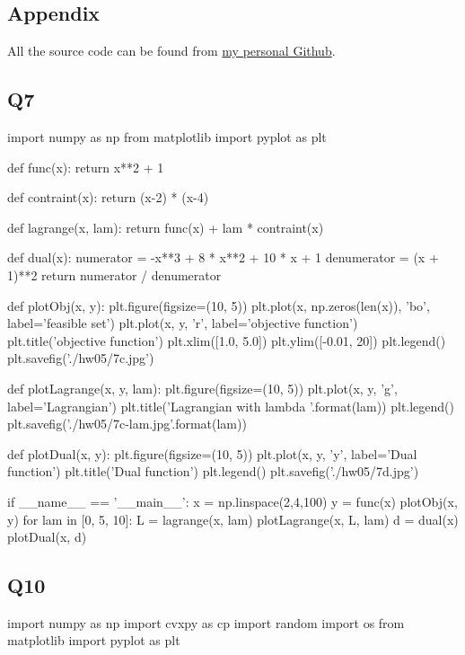 \documentclass[12pt, a4 paper]{article}
\begin{document}
    \begin{framed}
        \section{Appendix}
        All the source code can be found from
        \href{https://github.com/masqueraderx}{my personal Github}.
        \subsection{Q7}
        \begin{python}
import numpy as np
from matplotlib import pyplot as plt

def func(x):
    return x**2 + 1

def contraint(x):
    return (x-2) * (x-4)

def lagrange(x, lam):
    return func(x) + lam * contraint(x)

def dual(x):
    numerator = -x**3 + 8 * x**2 + 10 * x + 1
    denumerator = (x + 1)**2
    return numerator / denumerator

def plotObj(x, y):
    plt.figure(figsize=(10, 5))
    plt.plot(x, np.zeros(len(x)), 'bo', label='feasible set')
    plt.plot(x, y, 'r', label='objective function')
    plt.title('objective function')
    plt.xlim([1.0, 5.0])
    plt.ylim([-0.01, 20])
    plt.legend()
    plt.savefig('./hw05/7c.jpg')

def plotLagrange(x, y, lam):
    plt.figure(figsize=(10, 5))
    plt.plot(x, y, 'g', label='Lagrangian')
    plt.title('Lagrangian with lambda {}'.format(lam))
    plt.legend()
    plt.savefig('./hw05/7c-lam{}.jpg'.format(lam))

def plotDual(x, y):
    plt.figure(figsize=(10, 5))
    plt.plot(x, y, 'y', label='Dual function')
    plt.title('Dual function')
    plt.legend()
    plt.savefig('./hw05/7d.jpg')


if __name__ == '__main__':
    x = np.linspace(2,4,100)
    y = func(x)
    plotObj(x, y)
    for lam in [0, 5, 10]:
        L = lagrange(x, lam)
        plotLagrange(x, L, lam)
    d = dual(x)
    plotDual(x, d)
        \end{python}

        \subsection{Q10}
        \begin{python}
import numpy as np
import cvxpy as cp
import random
import os
from matplotlib import pyplot as plt


\end{python}
\end{framed}
\end{document}
